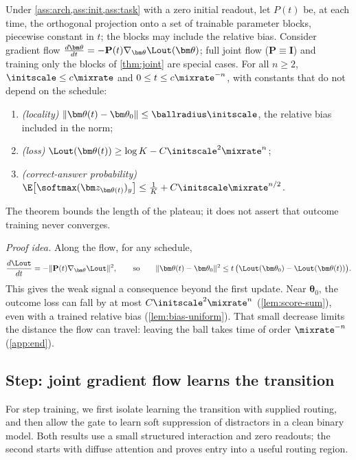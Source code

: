 \begin{theorem}
\label{thm:outcome-end}
Under \cref{ass:arch,ass:init,ass:task} with a zero initial readout, let $P(t)$ be, at each time, the orthogonal projection onto a set
of trainable parameter blocks, piecewise constant in $t$; the blocks may include the relative bias. Consider gradient flow
$\tfrac{d\bm\theta}{dt}=-\mathbf P(t)\nabla_{\bm\theta}\Lout(\bm\theta)$; full joint flow ($\mathbf P\equiv\mathbf I$) and training only the blocks of \cref{thm:joint} are special cases.
For all $n\ge2$, $\initscale\le c\mixrate$ and $0\le t\le c\mixrate^{-n}$, with constants that do not depend on the schedule:
\begin{enumerate}[label=(\roman*),leftmargin=*,itemsep=0pt,topsep=2pt]
\item \emph{(locality)} $\|\bm\theta(t)-\bm\theta_0\|\le\ballradius\initscale$, the relative bias included in the norm;
\item \emph{(loss)} $\Lout(\bm\theta(t))\ge\log K-C\initscale^2\mixrate^n$;
\item \emph{(correct-answer probability)} $\E\bigl[\softmax(\bm z_{\bm\theta(t)})_y\bigr]\le\frac{1}{K}+C\initscale\mixrate^{n/2}$.
\end{enumerate}
\end{theorem}
The theorem bounds the length of the plateau; it does not assert that outcome training never converges.

\emph{Proof idea.} Along the flow, for any schedule,
\[
 \frac{d\Lout}{dt}=-\|\mathbf P(t)\nabla_{\bm\theta}\Lout\|^2,
 \qquad\text{so}\qquad
 \|\bm\theta(t)-\bm\theta_0\|^2\le t\,\bigl(\Lout(\bm\theta_0)-\Lout(\bm\theta(t))\bigr).
\]
This gives the weak signal a consequence beyond the first update. Near $\bm\theta_0$, the outcome loss can fall by at most
$C\initscale^2\mixrate^n$ (\cref{lem:score-sum}), even with a trained relative bias (\cref{lem:bias-uniform}). That small decrease limits
the distance the flow can travel: leaving the ball takes time of order $\mixrate^{-n}$ (\cref{app:end}).

\subsection{Step: joint gradient flow learns the transition}
\label{sec:step}
For step training, we first isolate learning the transition with supplied routing, and then allow the gate to learn
soft suppression of distractors in a clean binary model. Both results use a small structured interaction and zero readouts;
the second starts with diffuse attention and proves entry into a useful routing region.

